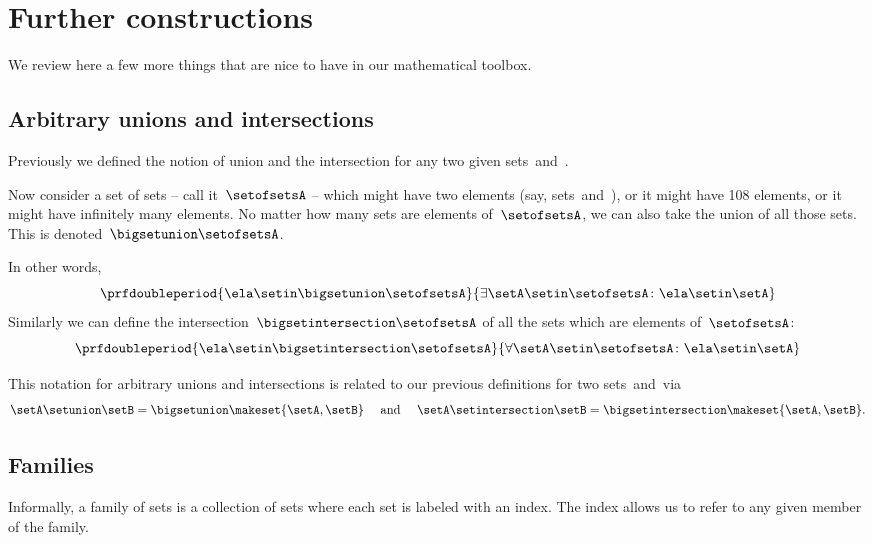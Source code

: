 
\section{Further constructions}
\label{sec:more-constructions}

We review here a few more things that are nice to have in our mathematical toolbox.

\subsection{Arbitrary unions and intersections}

Previously we defined the notion of union and the intersection for any two given sets~\setA and~\setB.

Now consider a set of sets -- call it~$\setofsetsA$ -- which might have two elements (say, sets~\setA and~\setB), or it might have 108 elements, or it might have infinitely many elements.
No matter how many sets are elements of~$\setofsetsA$, we can also take the union of all those sets.
This is denoted~$\bigsetunion \setofsetsA$.

In other words,
%
\begin{equation}
    \prfdoubleperiod{ \ela \setin\bigsetunion \setofsetsA }{\exists \setA \setin\setofsetsA \colon \ela \setin\setA}
\end{equation}
%
Similarly we can define the intersection~$\bigsetintersection \setofsetsA$ of all the sets which are elements of~$\setofsetsA$:
%
\begin{equation}
    \prfdoubleperiod{\ela \setin\bigsetintersection \setofsetsA}{\forall \setA \setin\setofsetsA \colon \ela \setin\setA}
\end{equation}

This notation for arbitrary unions and intersections is related to our previous definitions for two sets~\setA and~\setB via
\begin{equation}
    \setA \setunion \setB = \bigsetunion \makeset{ \setA, \setB }  \quad \text{ and } \quad \setA \setintersection \setB = \bigsetintersection \makeset{ \setA, \setB }.
\end{equation}

\subsection{Families}

Informally, a family of sets is a collection of sets where each set is labeled with an index.
The index allows us to refer to any given member of the family.

